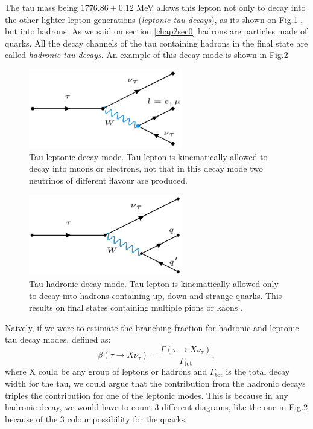 The tau mass being $1776.86 \pm 0.12$ MeV allows this lepton not only to decay into the other lighter lepton generations (\textit{leptonic tau decays}), as its shown on Fig.\ref{Fig1}  , but into hadrons. As we said on section \ref{chap2sec0} hadrons are particles made of quarks. All the decay channels of the tau containing hadrons in the final state are called \textit{hadronic tau decays}. An example of this decay mode is shown in Fig.\ref{Fig2}
\begin{figure}[h]
	\centering
	\includegraphics[width=0.6\textwidth]{figures/Fig1}
	\caption{Tau leptonic decay mode. Tau lepton is kinematically allowed to decay into muons or electrons, not that in this decay mode two neutrinos of different flavour are produced.}
	\label{Fig1}
\end{figure}
\begin{figure}[h]
	\centering
	\includegraphics[width=0.6\textwidth]{figures/Fig2}
	\caption{Tau hadronic decay mode. Tau lepton is kinematically allowed only to decay into hadrons containing up, down and strange quarks. This results on final states containing multiple pions or kaons \cite{Davier_2006}.}
	\label{Fig2}
\end{figure}
Naively, if we were to estimate the branching fraction for hadronic and leptonic tau decay modes, defined as:
\begin{equation}
	\beta(\tau\to X\nu_\tau)=\frac{\Gamma(\tau\to X\nu_\tau)}{\Gamma_{\text{tot}}},
\end{equation}
where X could be any group of leptons or hadrons and $\Gamma_{\text{tot}}$ is the total decay width for the tau, we could argue that the contribution from the hadronic decays triples the contribution for one of the leptonic modes. This is because in any hadronic decay, we would have to count 3 different diagrams, like the one in Fig.\ref{Fig2} because of the 3 colour possibility for the quarks.

